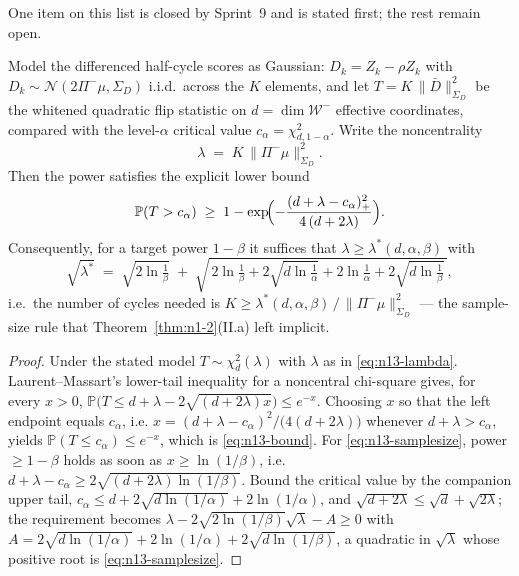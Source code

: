 One item on this list is closed by Sprint~9 and is stated first; the rest remain
open.

\begin{proposition}
\label{prop:n1-3-power}
Model the differenced half-cycle scores as Gaussian: $D_k = Z_k - \rho Z_k$ with
$D_k \sim \mathcal{N}(2\Pi^-\mu, \Sigma_D)$ i.i.d.\ across the $K$ elements, and
let $T = K\,\|\bar D\|^2_{\Sigma_D}$ be the whitened quadratic flip statistic on
$d = \dim \mathcal{W}^-$ effective coordinates, compared with the level-$\alpha$
critical value $c_\alpha = \chi^2_{d,1-\alpha}$. Write the noncentrality
\begin{equation}
  \label{eq:n13-lambda}
  \lambda \;=\; K\,\|\Pi^-\mu\|^2_{\Sigma_D}.
\end{equation}
Then the power satisfies the explicit lower bound
\begin{equation}
  \label{eq:n13-bound}
  \mathbb{P}(T > c_\alpha)
  \;\ge\; 1 - \exp\!\Bigl(-\frac{(d + \lambda - c_\alpha)_+^2}{4\,(d + 2\lambda)}\Bigr).
\end{equation}
Consequently, for a target power $1-\beta$ it suffices that
$\lambda \ge \lambda^*(d,\alpha,\beta)$ with
\begin{equation}
  \label{eq:n13-samplesize}
  \sqrt{\lambda^*} \;=\; \sqrt{2\ln\tfrac1\beta}
  \;+\; \sqrt{\,2\ln\tfrac1\beta + 2\sqrt{d\ln\tfrac1\alpha} + 2\ln\tfrac1\alpha + 2\sqrt{d\ln\tfrac1\beta}\,},
\end{equation}
i.e.\ the number of cycles needed is
$K \ge \lambda^*(d,\alpha,\beta)\,/\,\|\Pi^-\mu\|^2_{\Sigma_D}$ --- the
sample-size rule that Theorem~\ref{thm:n1-2}(II.a) left implicit.
\end{proposition}

\begin{proof}
Under the stated model $T \sim \chi^2_d(\lambda)$ with $\lambda$ as in
\eqref{eq:n13-lambda}. Laurent--Massart's lower-tail inequality for a
noncentral chi-square \cite{laurent2000adaptive} gives, for every $x > 0$,
$\mathbb{P}\bigl(T \le d + \lambda - 2\sqrt{(d + 2\lambda)x}\bigr) \le e^{-x}$.
Choosing $x$ so that the left endpoint equals $c_\alpha$, i.e.
$x = (d+\lambda-c_\alpha)^2 / \bigl(4(d+2\lambda)\bigr)$ whenever
$d + \lambda > c_\alpha$, yields $\mathbb{P}(T \le c_\alpha) \le e^{-x}$, which
is \eqref{eq:n13-bound}. For \eqref{eq:n13-samplesize}, power $\ge 1-\beta$
holds as soon as $x \ge \ln(1/\beta)$, i.e.
$d + \lambda - c_\alpha \ge 2\sqrt{(d+2\lambda)\ln(1/\beta)}$. Bound the
critical value by the companion upper tail,
$c_\alpha \le d + 2\sqrt{d\ln(1/\alpha)} + 2\ln(1/\alpha)$, and
$\sqrt{d + 2\lambda} \le \sqrt d + \sqrt{2\lambda}$; the requirement becomes
$\lambda - 2\sqrt{2\ln(1/\beta)}\sqrt{\lambda} - A \ge 0$ with
$A = 2\sqrt{d\ln(1/\alpha)} + 2\ln(1/\alpha) + 2\sqrt{d\ln(1/\beta)}$, a
quadratic in $\sqrt\lambda$ whose positive root is \eqref{eq:n13-samplesize}.
\end{proof}

